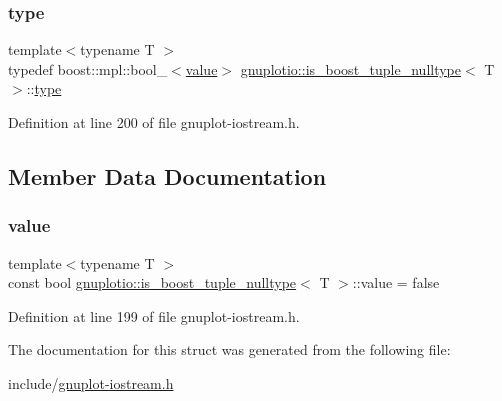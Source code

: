 \subsubsection{\texorpdfstring{type}{type}}
{\footnotesize\ttfamily template$<$typename T $>$ \\
typedef boost\+::mpl\+::bool\+\_\+$<$\hyperlink{structgnuplotio_1_1is__boost__tuple__nulltype_aed42a98e58eb94c7ba55ea7d2a8f7fd2}{value}$>$ \hyperlink{structgnuplotio_1_1is__boost__tuple__nulltype}{gnuplotio\+::is\+\_\+boost\+\_\+tuple\+\_\+nulltype}$<$ T $>$\+::\hyperlink{structgnuplotio_1_1is__boost__tuple__nulltype_a6b9e2eaadcaa5c788131d4e9e4186349}{type}}



Definition at line 200 of file gnuplot-\/iostream.\+h.



\subsection{Member Data Documentation}
\mbox{\label{structgnuplotio_1_1is__boost__tuple__nulltype_aed42a98e58eb94c7ba55ea7d2a8f7fd2}} 
\subsubsection{\texorpdfstring{value}{value}}
{\footnotesize\ttfamily template$<$typename T $>$ \\
const bool \hyperlink{structgnuplotio_1_1is__boost__tuple__nulltype}{gnuplotio\+::is\+\_\+boost\+\_\+tuple\+\_\+nulltype}$<$ T $>$\+::value = false\hspace{0.3cm}{\ttfamily [static]}}



Definition at line 199 of file gnuplot-\/iostream.\+h.



The documentation for this struct was generated from the following file\+:\begin{DoxyCompactItemize}
\item 
include/\hyperlink{gnuplot-iostream_8h}{gnuplot-\/iostream.\+h}\end{DoxyCompactItemize}
